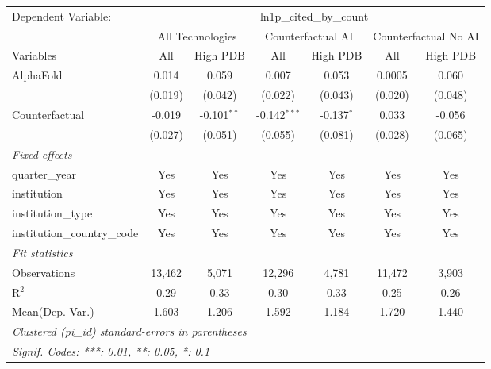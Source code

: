 \begingroup
\centering
\begin{tabular}{lcccccc}
   \tabularnewline \midrule \midrule
   Dependent Variable: & \multicolumn{6}{c}{ln1p\_cited\_by\_count}\\
 & \multicolumn{2}{c}{All Technologies} & \multicolumn{2}{c}{Counterfactual AI} & \multicolumn{2}{c}{Counterfactual No AI} \\
\cmidrule(lr){1-1}\cmidrule(lr){2-3} \cmidrule(lr){4-5} \cmidrule(lr){6-7}
Variables & \multicolumn{1}{c}{All} & \multicolumn{1}{c}{High PDB} & \multicolumn{1}{c}{All} & \multicolumn{1}{c}{High PDB} & \multicolumn{1}{c}{All} & \multicolumn{1}{c}{High PDB} \\
\cmidrule(lr){1-1}\cmidrule(lr){2-2} \cmidrule(lr){3-3} \cmidrule(lr){4-4} \cmidrule(lr){5-5} \cmidrule(lr){6-6} \cmidrule(lr){7-7}
   AlphaFold                    & 0.014   & 0.059         & 0.007          & 0.053        & 0.0005  & 0.060\\   
                                & (0.019) & (0.042)       & (0.022)        & (0.043)      & (0.020) & (0.048)\\   
   Counterfactual               & -0.019  & -0.101$^{**}$ & -0.142$^{***}$ & -0.137$^{*}$ & 0.033   & -0.056\\   
                                & (0.027) & (0.051)       & (0.055)        & (0.081)      & (0.028) & (0.065)\\   
   \midrule
   \emph{Fixed-effects}\\
   quarter\_year                & Yes     & Yes           & Yes            & Yes          & Yes     & Yes\\  
   institution                  & Yes     & Yes           & Yes            & Yes          & Yes     & Yes\\  
   institution\_type            & Yes     & Yes           & Yes            & Yes          & Yes     & Yes\\  
   institution\_country\_code   & Yes     & Yes           & Yes            & Yes          & Yes     & Yes\\  
   \midrule
   \emph{Fit statistics}\\
   Observations                 & 13,462  & 5,071         & 12,296         & 4,781        & 11,472  & 3,903\\  
   R$^2$                        & 0.29    & 0.33          & 0.30           & 0.33         & 0.25    & 0.26\\  
Mean(Dep. Var.) & 1.603 & 1.206 & 1.592 & 1.184 & 1.720 & 1.440 \\
   \midrule \midrule
   \multicolumn{7}{l}{\emph{Clustered (pi\_id) standard-errors in parentheses}}\\
   \multicolumn{7}{l}{\emph{Signif. Codes: ***: 0.01, **: 0.05, *: 0.1}}\\
\end{tabular}
\par\endgroup
